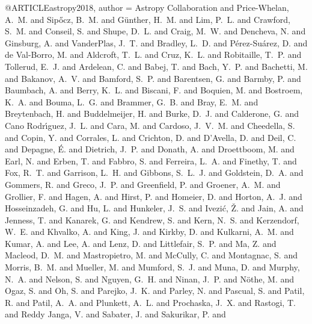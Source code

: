 
@ARTICLE{astropy2018,
   author = {{Astropy Collaboration} and {Price-Whelan}, A.~M. and {Sip{\H o}cz}, B.~M. and
	{G{\"u}nther}, H.~M. and {Lim}, P.~L. and {Crawford}, S.~M. and
	{Conseil}, S. and {Shupe}, D.~L. and {Craig}, M.~W. and {Dencheva}, N. and
	{Ginsburg}, A. and {VanderPlas}, J.~T. and {Bradley}, L.~D. and
	{P{\'e}rez-Su{\'a}rez}, D. and {de Val-Borro}, M. and {Aldcroft}, T.~L. and
	{Cruz}, K.~L. and {Robitaille}, T.~P. and {Tollerud}, E.~J. and
	{Ardelean}, C. and {Babej}, T. and {Bach}, Y.~P. and {Bachetti}, M. and
	{Bakanov}, A.~V. and {Bamford}, S.~P. and {Barentsen}, G. and
	{Barmby}, P. and {Baumbach}, A. and {Berry}, K.~L. and {Biscani}, F. and
	{Boquien}, M. and {Bostroem}, K.~A. and {Bouma}, L.~G. and {Brammer}, G.~B. and
	{Bray}, E.~M. and {Breytenbach}, H. and {Buddelmeijer}, H. and
	{Burke}, D.~J. and {Calderone}, G. and {Cano Rodr{\'{\i}}guez}, J.~L. and
	{Cara}, M. and {Cardoso}, J.~V.~M. and {Cheedella}, S. and {Copin}, Y. and
	{Corrales}, L. and {Crichton}, D. and {D'Avella}, D. and {Deil}, C. and
	{Depagne}, {\'E}. and {Dietrich}, J.~P. and {Donath}, A. and
	{Droettboom}, M. and {Earl}, N. and {Erben}, T. and {Fabbro}, S. and
	{Ferreira}, L.~A. and {Finethy}, T. and {Fox}, R.~T. and {Garrison}, L.~H. and
	{Gibbons}, S.~L.~J. and {Goldstein}, D.~A. and {Gommers}, R. and
	{Greco}, J.~P. and {Greenfield}, P. and {Groener}, A.~M. and
	{Grollier}, F. and {Hagen}, A. and {Hirst}, P. and {Homeier}, D. and
	{Horton}, A.~J. and {Hosseinzadeh}, G. and {Hu}, L. and {Hunkeler}, J.~S. and
	{Ivezi{\'c}}, {\v Z}. and {Jain}, A. and {Jenness}, T. and {Kanarek}, G. and
	{Kendrew}, S. and {Kern}, N.~S. and {Kerzendorf}, W.~E. and
	{Khvalko}, A. and {King}, J. and {Kirkby}, D. and {Kulkarni}, A.~M. and
	{Kumar}, A. and {Lee}, A. and {Lenz}, D. and {Littlefair}, S.~P. and
	{Ma}, Z. and {Macleod}, D.~M. and {Mastropietro}, M. and {McCully}, C. and
	{Montagnac}, S. and {Morris}, B.~M. and {Mueller}, M. and {Mumford}, S.~J. and
	{Muna}, D. and {Murphy}, N.~A. and {Nelson}, S. and {Nguyen}, G.~H. and
	{Ninan}, J.~P. and {N{\"o}the}, M. and {Ogaz}, S. and {Oh}, S. and
	{Parejko}, J.~K. and {Parley}, N. and {Pascual}, S. and {Patil}, R. and
	{Patil}, A.~A. and {Plunkett}, A.~L. and {Prochaska}, J.~X. and
	{Rastogi}, T. and {Reddy Janga}, V. and {Sabater}, J. and {Sakurikar}, P. and
}}
